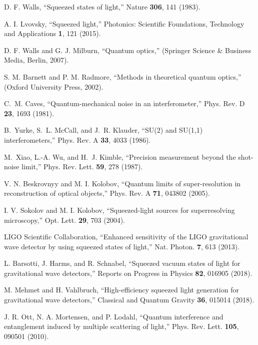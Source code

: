 \documentclass[9pt,twocolumn,twoside]{osajnl}
\begin{document}
\begin{thebibliography}{99}
 D. F. Walls, \enquote{Squeezed states of light,} Nature \textbf{306}, 141 (1983).

 A. I. Lvovsky, \enquote{Squeezed light,} Photonics: Scientific Foundations, Technology and Applications \textbf{1}, 121 (2015).


 D. F. Walls and G. J. Milburn, \enquote{Quantum optics,} (Springer Science \& Business Media, Berlin, 2007).

 S. M. Barnett and P. M. Radmore, \enquote{Methods in theoretical quantum optics,} (Oxford University Press, 2002).

C.~M. Caves, \enquote{Quantum-mechanical noise in an interferometer,} Phys.
  Rev. D \textbf{23}, 1693 (1981).

B.~Yurke, S.~L. McCall, and J.~R. Klauder, \enquote{SU(2) and SU(1,1) interferometers,} Phys. Rev. A \textbf{33}, 4033 (1986).

M.~Xiao, L.-A. Wu, and H.~J. Kimble, \enquote{Precision measurement beyond the shot-noise limit,} Phys. Rev. Lett. \textbf{59}, 278 (1987).


 V. N. Beskrovnyy and M. I. Kolobov, \enquote{Quantum limits of super-resolution in reconstruction of optical objects,} Phys. Rev. A \textbf{71}, 043802 (2005).

 I. V. Sokolov and M. I. Kolobov, \enquote{Squeezed-light sources for superresolving microscopy,} Opt. Lett. \textbf{29}, 703 (2004).


 LIGO Scientific Collaboration, \enquote{Enhanced sensitivity of the LIGO gravitational wave detector by using squeezed states of light,} Nat. Photon. \textbf{7}, 613 (2013).

 L. Barsotti, J. Harms, and R. Schnabel, \enquote{Squeezed vacuum states of light for gravitational wave detectors,} Reports on Progress in Physics \textbf{82}, 016905 (2018).

 M. Mehmet and H. Vahlbruch, \enquote{High-efficiency squeezed light generation for gravitational wave detectors,} Classical and Quantum Gravity \textbf{36}, 015014 (2018).


 J. R. Ott, N. A. Mortensen, and P. Lodahl, \enquote{Quantum interference and entanglement induced by multiple scattering of light,} Phys. Rev. Lett. \textbf{105}, 090501 (2010).


\end{thebibliography}
\end{document}
